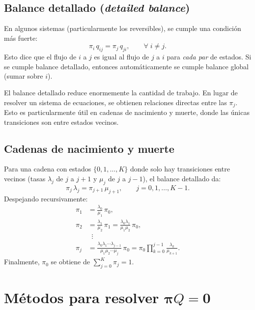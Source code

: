 \documentclass[11pt,a4paper]{article}
\theoremstyle{definition}
\theoremstyle{remark}
\begin{document}
\subsection{Balance detallado (\textit{detailed balance})}

En algunos sistemas (particularmente los reversibles), se cumple una
condición más fuerte:
\[
  \pi_i\,q_{ij} = \pi_j\,q_{ji}, \qquad \forall\; i \ne j.
\]
Esto dice que el flujo de $i$ a $j$ es igual al flujo de $j$ a $i$
para \emph{cada par} de estados.  Si se cumple balance detallado,
entonces automáticamente se cumple balance global (sumar sobre $i$).

\begin{cajanota}
El balance detallado reduce enormemente la cantidad de trabajo.  En
lugar de resolver un sistema de ecuaciones, se obtienen relaciones
directas entre las $\pi_j$.  Esto es particularmente útil en cadenas
de nacimiento y muerte, donde las únicas transiciones son entre estados
vecinos.
\end{cajanota}

\subsection{Cadenas de nacimiento y muerte}

Para una cadena con estados $\{0,1,\dots,K\}$ donde solo hay
transiciones entre vecinos (tasas $\lambda_j$ de $j$ a $j+1$ y $\mu_j$
de $j$ a $j-1$), el balance detallado da:
\[
  \pi_j\,\lambda_j = \pi_{j+1}\,\mu_{j+1}, \qquad j=0,1,\dots,K-1.
\]
Despejando recursivamente:
\begin{align*}
  \pi_1 &= \frac{\lambda_0}{\mu_1}\,\pi_0, \\
  \pi_2 &= \frac{\lambda_1}{\mu_2}\,\pi_1
          = \frac{\lambda_0\lambda_1}{\mu_1\mu_2}\,\pi_0, \\
  &\;\;\vdots \\
  \pi_j &= \frac{\lambda_0\lambda_1\cdots\lambda_{j-1}}
                 {\mu_1\mu_2\cdots\mu_j}\,\pi_0
         = \pi_0\prod_{k=0}^{j-1}\frac{\lambda_k}{\mu_{k+1}}.
\end{align*}
Finalmente, $\pi_0$ se obtiene de $\sum_{j=0}^K \pi_j = 1$.

\section{Métodos para resolver \texorpdfstring{$\boldsymbol{\pi}Q=\boldsymbol{0}$}{πQ=0}}
\end{document}

